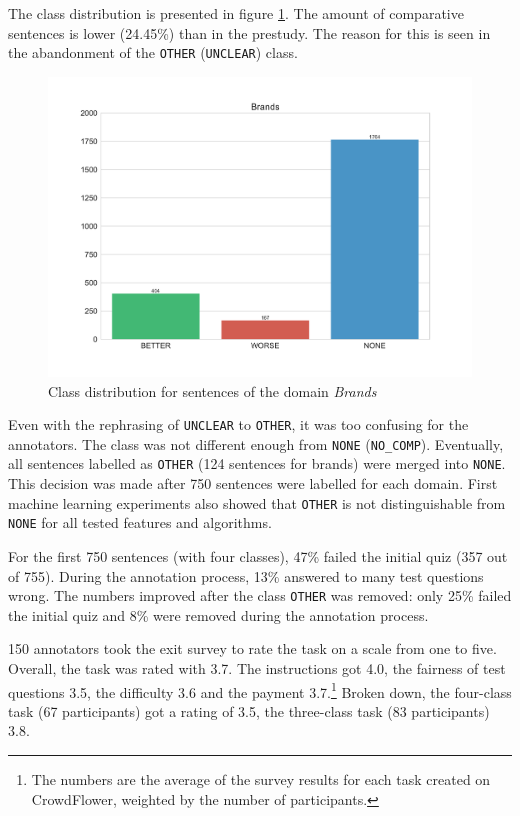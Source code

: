 The class distribution is presented in figure \ref{fig:brands_fin}. The amount of comparative sentences is lower (24.45\%) than in the prestudy. The reason for this is seen in the abandonment of the \texttt{OTHER} (\texttt{UNCLEAR}) class. 

\begin{figure}[h]
\centering
\caption{Class distribution for sentences of the domain \emph{Brands}}
\label{fig:brands_fin}
\includegraphics[width=1\textwidth]{images/dataset/Brands-dist}
\end{figure}




Even with the rephrasing of \texttt{UNCLEAR} to \texttt{OTHER}, it was too confusing for the annotators. The class was not different enough from \texttt{NONE} (\texttt{NO\_COMP}). Eventually, all sentences labelled as \texttt{OTHER} (124 sentences for brands) were merged into \texttt{NONE}. This decision was made after 750 sentences were labelled for each domain. First machine learning experiments also showed that \texttt{OTHER} is not distinguishable from \texttt{NONE} for all tested features and algorithms.

For the first 750 sentences (with four classes), 47\% failed the initial quiz (357 out of 755). During the annotation process, 13\% answered to many test questions wrong. The numbers improved after the class \texttt{OTHER} was removed: only 25\% failed the initial quiz and 8\% were removed during the annotation process.

150 annotators took the exit survey to rate the task on a scale from one to five. Overall, the task was rated with 3.7. The instructions got 4.0, the fairness of test questions 3.5, the difficulty 3.6 and the payment 3.7.\footnote{The numbers are the average of the survey results for each task created on CrowdFlower, weighted by the number of participants.} Broken down, the four-class task (67 participants) got a rating of 3.5, the three-class task (83 participants) 3.8.


